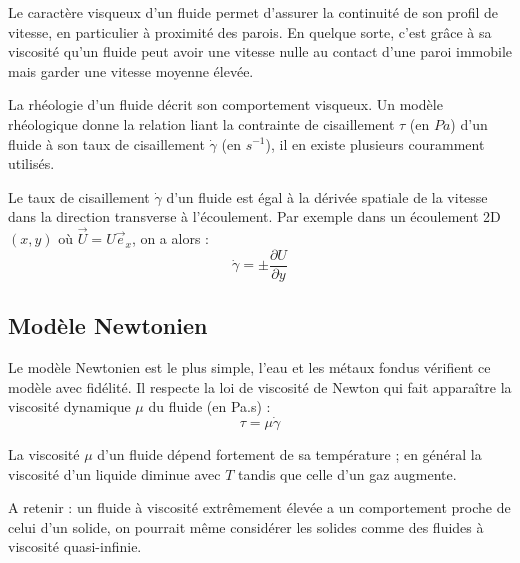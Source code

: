 Le caractère visqueux d'un fluide permet d'assurer la continuité de son profil de vitesse, en particulier à proximité des parois. En quelque sorte, c'est grâce à sa viscosité qu'un fluide peut avoir une vitesse nulle au contact d'une paroi immobile mais garder une vitesse moyenne élevée.

La rhéologie d'un fluide décrit son comportement visqueux. Un modèle rhéologique donne la relation liant la contrainte de cisaillement $\tau$ (en $Pa$) d'un fluide à son taux de cisaillement $\dot{\gamma}$ (en $s^{-1}$), il en existe plusieurs couramment utilisés.

Le taux de cisaillement $\dot{\gamma}$ d'un fluide est égal à la dérivée spatiale de la vitesse dans la direction transverse à l'écoulement. Par exemple dans un écoulement 2D $(x,y)$ où $\vec{U} = U \vec{e}_x$, on a alors :
%
\begin{equation}
    \dot{\gamma} = \pm \frac{\partial U}{\partial y}
\end{equation}

\subsection{Modèle Newtonien}

Le modèle Newtonien est le plus simple, l'eau et les métaux fondus vérifient ce modèle avec fidélité. Il respecte la loi de viscosité de Newton qui fait apparaître la viscosité dynamique $\mu$ du fluide (en Pa.s) :
%
\begin{equation}
    \tau = \mu \dot{\gamma}
\end{equation}

La viscosité $\mu$ d'un fluide dépend fortement de sa température ; en général la viscosité d'un liquide diminue avec $T$ tandis que celle d'un gaz augmente.

A retenir : un fluide à viscosité extrêmement élevée a un comportement proche de celui d'un solide, on pourrait même considérer les solides comme des fluides à viscosité quasi-infinie.
